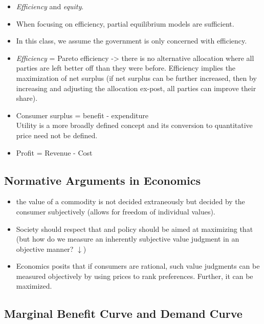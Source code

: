 \documentclass[
]{ltjarticle}
\providecommand{\tightlist}{%
  \setlength{\itemsep}{0pt}\setlength{\parskip}{0pt}}
\begin{document}
\begin{itemize}
\item
  \emph{Efficiency} and \emph{equity}.
\item
  When focusing on efficiency, partial equilibrium models are
  sufficient.
\item
  In this class, we assume the government is only concerned with
  efficiency.
\item
  \emph{Efficiency} = Pareto efficiency -\textgreater{} there is no
  alternative allocation where all parties are left better off than they
  were before. Efficiency implies the maximization of net surplus (if
  net surplus can be further increased, then by increasing and adjusting
  the allocation ex-post, all parties can improve their share).
\item
  Consumer surplus = benefit - expenditure\\
  Utility is a more broadly defined concept and its conversion to
  quantitative price need not be defined.
\item
  Profit = Revenue - Cost
\end{itemize}

\hypertarget{normative-arguments-in-economics}{%
\subsection{Normative Arguments in
Economics}\label{normative-arguments-in-economics}}

\begin{itemize}
\tightlist
\item
  the value of a commodity is not decided extraneously but decided by
  the consumer subjectively (allows for freedom of individual values).\\
\item
  Society should respect that and policy should be aimed at maximizing
  that (but how do we measure an inherently subjective value judgment in
  an objective manner? \(\downarrow\))\\
\item
  Economics posits that if consumers are rational, such value judgments
  can be measured objectively by using prices to rank preferences.
  Further, it can be maximized.
\end{itemize}

\hypertarget{marginal-benefit-curve-and-demand-curve}{%
\subsection{Marginal Benefit Curve and Demand
Curve}\label{marginal-benefit-curve-and-demand-curve}}
\end{document}

